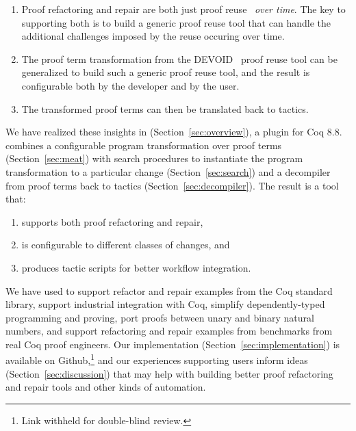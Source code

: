 \begin{enumerate}
\item Proof refactoring and repair are both just proof reuse~\cite{Ringer2019, felty1994generalization, caplan1995logical, pons2000generalization, johnsen2004theorem} \textit{over time}. The key to supporting both is to build a generic proof reuse
tool that can handle the additional challenges imposed by the reuse occuring over time. 
\item The proof term transformation from the \textsc{DEVOID}~\cite{Ringer2019} proof reuse tool can be generalized
to build such a generic proof reuse tool, and the result is configurable both by the developer and by the user.
\item The transformed proof terms can then be translated back to tactics.
\end{enumerate}

We have realized these insights in \toolname (Section~\ref{sec:overview}), a plugin for Coq 8.8. \toolname combines a
configurable program transformation over proof terms (Section~\ref{sec:meat})
with search procedures to instantiate the program transformation to a particular change (Section~\ref{sec:search})
and a decompiler from proof terms back to tactics (Section~\ref{sec:decompiler}).
The result is a tool that:

\begin{enumerate}
\item supports both proof refactoring and repair,
\item is configurable to different classes of changes, and
\item produces tactic scripts for better workflow integration.
\end{enumerate}
We have used \toolname to support refactor and repair examples from the Coq standard library,
support industrial integration with Coq,
simplify dependently-typed programming and proving,
port proofs between unary and binary natural numbers,
and support refactoring and repair examples from benchmarks from real Coq proof engineers.
Our implementation (Section~\ref{sec:implementation}) is available on Github,\footnote{Link withheld for double-blind review.}
and our experiences supporting users inform ideas (Section~\ref{sec:discussion}) that may help with building better
proof refactoring and repair tools and other kinds of automation.


